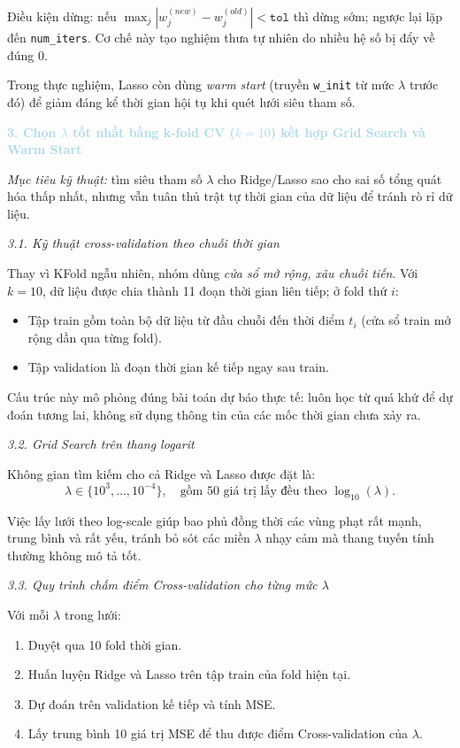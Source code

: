 Điều kiện dừng: nếu $\max_j |w_j^{(new)}-w_j^{(old)}|<\texttt{tol}$ thì dừng sớm; ngược lại lặp
đến \texttt{num\_iters}. Cơ chế này tạo nghiệm thưa tự nhiên do nhiều hệ số bị đẩy về đúng 0.

Trong thực nghiệm, Lasso còn dùng \textit{warm start} (truyền \texttt{w\_init} từ mức
$\lambda$ trước đó) để giảm đáng kể thời gian hội tụ khi quét lưới siêu tham số.

\noindent\textcolor{lightblue}{\textbf{3. Chọn $\lambda$ tốt nhất bằng k-fold CV ($k=10$) kết hợp Grid Search và Warm Start}}

\textit{Mục tiêu kỹ thuật:} tìm siêu tham số $\lambda$ cho Ridge/Lasso sao cho sai số tổng quát hóa thấp nhất,
nhưng vẫn tuân thủ trật tự thời gian của dữ liệu để tránh rò rỉ dữ liệu.

\noindent\textcolor{infocolor}{\textit{3.1. Kỹ thuật cross-validation theo chuỗi thời gian}}

Thay vì KFold ngẫu nhiên, nhóm dùng \textit{cửa sổ mở rộng, xâu chuỗi tiến}.
Với $k=10$, dữ liệu được chia thành 11 đoạn thời gian liên tiếp; ở fold thứ $i$:
\begin{itemize} [labelsep=10pt, leftmargin=2cm]
    \item Tập train gồm toàn bộ dữ liệu từ đầu chuỗi đến thời điểm $t_i$ (cửa sổ train mở rộng dần qua từng fold).
    \item Tập validation là đoạn thời gian kế tiếp ngay sau train.
\end{itemize}

Cấu trúc này mô phỏng đúng bài toán dự báo thực tế: luôn học từ quá khứ để dự đoán tương lai,
không sử dụng thông tin của các mốc thời gian chưa xảy ra.

\noindent\textcolor{infocolor}{\textit{3.2. Grid Search trên thang logarit}}

Không gian tìm kiếm cho cả Ridge và Lasso được đặt là:
\begin{equation}
\lambda \in \{10^3,\ldots,10^{-4}\},\quad \text{gồm 50 giá trị lấy đều theo }\log_{10}(\lambda).
\end{equation}

Việc lấy lưới theo log-scale giúp bao phủ đồng thời các vùng phạt rất mạnh, trung bình và rất yếu,
tránh bỏ sót các miền $\lambda$ nhạy cảm mà thang tuyến tính thường không mô tả tốt.

\noindent\textcolor{infocolor}{\textit{3.3. Quy trình chấm điểm Cross-validation cho từng mức $\lambda$}}

Với mỗi $\lambda$ trong lưới:
\begin{enumerate} [labelsep=10pt, leftmargin=2cm]
    \item Duyệt qua 10 fold thời gian.
    \item Huấn luyện Ridge và Lasso trên tập train của fold hiện tại.
    \item Dự đoán trên validation kế tiếp và tính MSE.
    \item Lấy trung bình 10 giá trị MSE để thu được điểm Cross-validation của $\lambda$.
\end{enumerate}

